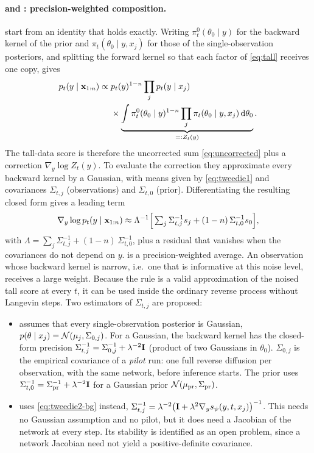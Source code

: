 \paragraph{\gauss{} and \jac: precision-weighted composition.}
\citet{linhart2024diffusion} start from an identity that holds exactly.
Writing $\pi^0_t(\theta_0\mid y)$ for the backward kernel of the prior and $\pi_t(\theta_0\mid y,x_j)$ for those of the single-observation posteriors, and splitting the forward kernel so that each factor of \cref{eq:tall} receives one copy, gives
\begin{equation}\label{eq:linhart-identity}
\begin{aligned}
  p_t(y\mid\mathbf{x}_{1:n})\propto\;&p_t(y)^{1-n}\prod_{j}p_t(y\mid x_j)\\
  &\times\underbrace{\int\pi^0_t(\theta_0\mid y)^{1-n}\prod_j\pi_t(\theta_0\mid y,x_j)\,\mathrm{d}\theta_0}_{=:Z_t(y)} .
\end{aligned}
\end{equation}
The tall-data score is therefore the uncorrected sum \cref{eq:uncorrected} plus a correction $\nabla_y\log Z_t(y)$.
To evaluate the correction they approximate every backward kernel by a Gaussian, with means given by \cref{eq:tweedie1} and covariances $\Sigma_{t,j}$ (observations) and $\Sigma_{t,0}$ (prior).
Differentiating the resulting closed form gives a leading term
\begin{equation}\label{eq:gauss-flat}
  \nabla_y\log p_t(y\mid\mathbf{x}_{1:n})\approx\Lambda^{-1}\Big[\textstyle\sum_{j}\Sigma_{t,j}^{-1}s_j+(1-n)\,\Sigma_{t,0}^{-1}s_0\Big],
\end{equation}
with $\Lambda=\sum_j\Sigma_{t,j}^{-1}+(1-n)\,\Sigma_{t,0}^{-1}$, plus a residual that vanishes when the covariances do not depend on $y$.
 is a precision-weighted average.
An observation whose backward kernel is narrow, i.e.\ one that is informative at this noise level, receives a large weight.
Because the rule is a valid approximation of the noised tall score at every $t$, it can be used inside the ordinary reverse process without Langevin steps.
Two estimators of $\Sigma_{t,j}$ are proposed:
\begin{itemize}
  \item \textbf{\gauss} assumes that every single-observation posterior is Gaussian, $p(\theta\mid x_j)=\mathcal{N}(\mu_j,\Sigma_{0,j})$. For a Gaussian, the backward kernel has the closed-form precision $\Sigma_{t,j}^{-1}=\Sigma_{0,j}^{-1}+\lambda^{-2}\mathbf{I}$ (product of two Gaussians in $\theta_0$). $\Sigma_{0,j}$ is the empirical covariance of a \emph{pilot} run: one full reverse diffusion per observation, with the same network, before inference starts. The prior uses $\Sigma_{t,0}^{-1}=\Sigma_\mathrm{pr}^{-1}+\lambda^{-2}\mathbf{I}$ for a Gaussian prior $\mathcal{N}(\mu_\mathrm{pr},\Sigma_\mathrm{pr})$.
  \item \textbf{\jac} uses \cref{eq:tweedie2-bg} instead, $\Sigma_{t,j}^{-1}=\lambda^{-2}\big(\mathbf{I}+\lambda^2\nabla_y s_\psi(y,t,x_j)\big)^{-1}$. This needs no Gaussian assumption and no pilot, but it does need a Jacobian of the network at every step. Its stability is identified as an open problem, since a network Jacobian need not yield a positive-definite covariance.
\end{itemize}
